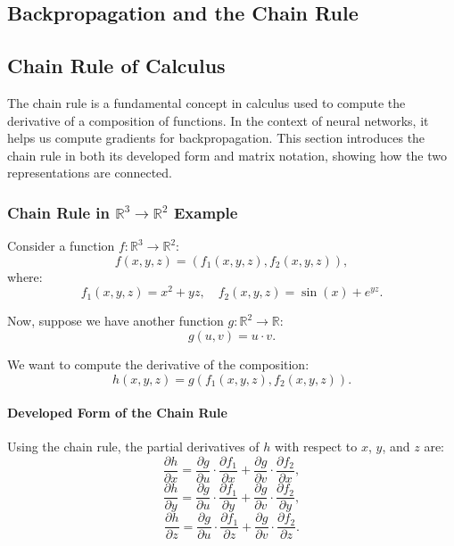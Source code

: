 \begin{notechapter}
\chapter{Backpropagation and the Chain Rule}\label{ch:backprop-chain-rule}

\section{Chain Rule of Calculus}
The chain rule is a fundamental concept in calculus used to compute the derivative of a composition of functions. In the context of neural networks, it helps us compute gradients for backpropagation. This section introduces the chain rule in both its developed form and matrix notation, showing how the two representations are connected.

\subsection{Chain Rule in \( \mathbb{R}^3 \rightarrow \mathbb{R}^2 \) Example}
Consider a function \( f: \mathbb{R}^3 \rightarrow \mathbb{R}^2 \):
\[
f(x, y, z) = (f_1(x, y, z), f_2(x, y, z)),
\]
where:
\[
f_1(x, y, z) = x^2 + yz, \quad f_2(x, y, z) = \sin(x) + e^{yz}.
\]

Now, suppose we have another function \( g: \mathbb{R}^2 \rightarrow \mathbb{R} \):
\[
g(u, v) = u \cdot v.
\]

We want to compute the derivative of the composition:
\[
h(x, y, z) = g(f_1(x, y, z), f_2(x, y, z)).
\]

\subsubsection{Developed Form of the Chain Rule}
Using the chain rule, the partial derivatives of \( h \) with respect to \( x \), \( y \), and \( z \) are:
\[
\frac{\partial h}{\partial x} = \frac{\partial g}{\partial u} \cdot \frac{\partial f_1}{\partial x} + \frac{\partial g}{\partial v} \cdot \frac{\partial f_2}{\partial x},
\]
\[
\frac{\partial h}{\partial y} = \frac{\partial g}{\partial u} \cdot \frac{\partial f_1}{\partial y} + \frac{\partial g}{\partial v} \cdot \frac{\partial f_2}{\partial y},
\]
\[
\frac{\partial h}{\partial z} = \frac{\partial g}{\partial u} \cdot \frac{\partial f_1}{\partial z} + \frac{\partial g}{\partial v} \cdot \frac{\partial f_2}{\partial z}.
\]


\end{notechapter}
